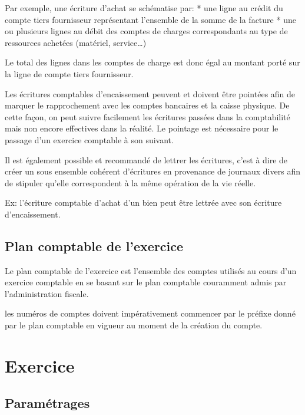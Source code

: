 \documentclass[a4paper,10pt,oneside,french]{sphinxmanual}
\begin{document}
Par exemple, une écriture d’achat se schématise par:
* une ligne au crédit du compte tiers fournisseur représentant l’ensemble de la somme de la facture
* une ou plusieurs lignes au débit des comptes de charges correspondants au type de ressources achetées (matériel, service…)

Le total des lignes dans les comptes de charge est donc égal au montant
porté sur la ligne de compte tiers fournisseur.

Les écritures comptables d’encaissement peuvent et doivent être pointées afin de marquer le rapprochement avec les comptes bancaires et
la caisse physique. De cette façon, on peut suivre facilement les écritures passées dans la comptabilité mais non encore effectives dans
la réalité. Le pointage est nécessaire pour le passage d’un exercice comptable à son suivant.

Il est également possible et recommandé de lettrer les écritures, c’est à dire de créer un sous ensemble
cohérent d’écritures en provenance de journaux divers afin de stipuler qu’elle correspondent à la même opération de la vie réelle.

Ex: l’écriture comptable d’achat d’un bien peut être lettrée avec son écriture d’encaissement.


\subsection{Plan comptable de l’exercice}
\label{\detokenize{accounting/definition:plan-comptable-de-l-exercice}}
Le plan comptable de l’exercice est l’ensemble des comptes utilisés au
cours d’un exercice comptable en se basant sur le plan comptable
couramment admis par l’administration fiscale.

les numéros de comptes doivent impérativement commencer par le préfixe donné par le
plan comptable en vigueur au moment de la création du compte.


\section{Exercice}
\label{\detokenize{accounting/fiscalyear:exercice}}\label{\detokenize{accounting/fiscalyear::doc}}

\subsection{Paramétrages}
\label{\detokenize{accounting/fiscalyear:parametrages}}\begin{quote}

\noindent{}
\end{quote}
\end{document}

